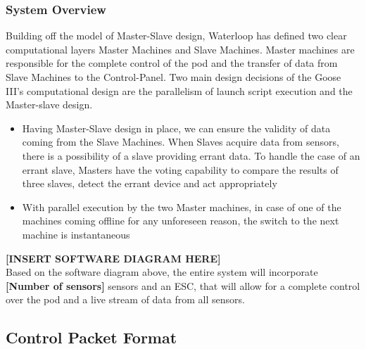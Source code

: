 \documentclass[main.tex]{subfiles}
\begin{document}
    \subsubsection{System Overview}
    Building off the model of Master-Slave design, Waterloop has defined two clear computational layers Master Machines and Slave Machines. Master machines are responsible for the complete control of the pod and the transfer of data from Slave Machines to the Control-Panel. Two main design decisions of the Goose III’s computational design are the parallelism of launch script execution and the Master-slave design.
    \begin{itemize}
        \item Having Master-Slave design in place, we can ensure the validity of data coming from the Slave Machines. When Slaves acquire data from sensors, there is a possibility of a slave providing errant data. To handle the case of an errant slave, Masters have the voting capability to compare the results of three slaves, detect the errant device and act appropriately
        \item With parallel execution by the two Master machines, in case of one of the machines coming offline for any unforeseen reason, the switch to the next machine is instantaneous
    \end{itemize}
    \textbf{[INSERT SOFTWARE DIAGRAM HERE]}\\
    Based on the software diagram above, the entire system will incorporate \textbf{[Number of sensors]} sensors and an ESC, that will allow for a complete control over the pod and a live stream of data from all sensors.
    \subsection{Control Packet Format}
\end{document}

